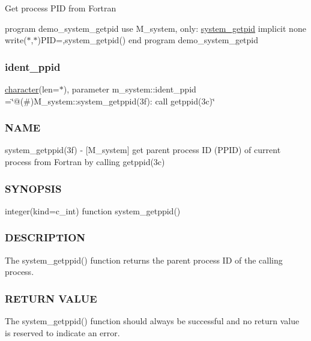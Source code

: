 Get process P\+ID from Fortran

program demo\+\_\+system\+\_\+getpid use M\+\_\+system, only\+: \hyperlink{interfacem__system_1_1system__getpid}{system\+\_\+getpid} implicit none write($\ast$,$\ast$)\textquotesingle{}P\+ID=\textquotesingle{},system\+\_\+getpid() end program demo\+\_\+system\+\_\+getpid \mbox{\label{namespacem__system_afba2912cdf74d31936daa4cd7a195bcb}} 
\subsubsection{\texorpdfstring{ident\+\_\+ppid}{ident\_ppid}}
{\footnotesize\ttfamily \hyperlink{option__stopwatch_83_8txt_abd4b21fbbd175834027b5224bfe97e66}{character}(len=$\ast$), parameter m\+\_\+system\+::ident\+\_\+ppid =\char`\"{}@(\#)M\+\_\+system\+::system\+\_\+getppid(3f)\+: call getppid(3c)\char`\"{}\hspace{0.3cm}{\ttfamily [private]}}



\subsubsection*{N\+A\+ME}

system\+\_\+getppid(3f) -\/ \mbox{[}M\+\_\+system\mbox{]} get parent process ID (P\+P\+ID) of current process from Fortran by calling getppid(3c) \subsubsection*{S\+Y\+N\+O\+P\+S\+IS}

integer(kind=c\+\_\+int) function system\+\_\+getppid() \subsubsection*{D\+E\+S\+C\+R\+I\+P\+T\+I\+ON}

The system\+\_\+getppid() function returns the parent process ID of the calling process.

\subsubsection*{R\+E\+T\+U\+RN V\+A\+L\+UE}

The system\+\_\+getppid() function should always be successful and no return value is reserved to indicate an error.

